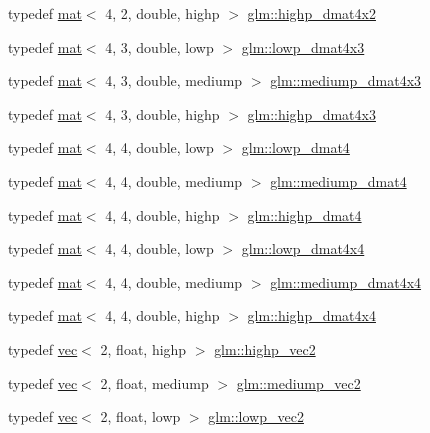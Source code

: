 \begin{DoxyCompactItemize}
\item 
typedef \hyperlink{structglm_1_1mat}{mat}$<$ 4, 2, double, highp $>$ \hyperlink{group__core__precision_ga22c6b4fe5bb2e33a3cfa1c026803dd68}{glm\+::highp\+\_\+dmat4x2}
\item 
typedef \hyperlink{structglm_1_1mat}{mat}$<$ 4, 3, double, lowp $>$ \hyperlink{group__core__precision_gaf829f4341a7592475df926eb9b416dd4}{glm\+::lowp\+\_\+dmat4x3}
\item 
typedef \hyperlink{structglm_1_1mat}{mat}$<$ 4, 3, double, mediump $>$ \hyperlink{group__core__precision_ga3c31b359e06498f36aae9bfde929a8ce}{glm\+::mediump\+\_\+dmat4x3}
\item 
typedef \hyperlink{structglm_1_1mat}{mat}$<$ 4, 3, double, highp $>$ \hyperlink{group__core__precision_ga9a5dab260df6e8c46c747bac0b8d2f38}{glm\+::highp\+\_\+dmat4x3}
\item 
typedef \hyperlink{structglm_1_1mat}{mat}$<$ 4, 4, double, lowp $>$ \hyperlink{group__core__precision_ga608895f4a515c7ac6cf3a1c2f11e13cc}{glm\+::lowp\+\_\+dmat4}
\item 
typedef \hyperlink{structglm_1_1mat}{mat}$<$ 4, 4, double, mediump $>$ \hyperlink{group__core__precision_ga4b027f0f888d5ec1e77a00cb5517f56a}{glm\+::mediump\+\_\+dmat4}
\item 
typedef \hyperlink{structglm_1_1mat}{mat}$<$ 4, 4, double, highp $>$ \hyperlink{group__core__precision_ga878bb8f4881dbf688ab9bbb5e2944a54}{glm\+::highp\+\_\+dmat4}
\item 
typedef \hyperlink{structglm_1_1mat}{mat}$<$ 4, 4, double, lowp $>$ \hyperlink{group__core__precision_ga336afc91799f59d9075eb94c3093612f}{glm\+::lowp\+\_\+dmat4x4}
\item 
typedef \hyperlink{structglm_1_1mat}{mat}$<$ 4, 4, double, mediump $>$ \hyperlink{group__core__precision_ga53d2b544e1cf6812ed3b2f152d16a770}{glm\+::mediump\+\_\+dmat4x4}
\item 
typedef \hyperlink{structglm_1_1mat}{mat}$<$ 4, 4, double, highp $>$ \hyperlink{group__core__precision_gad3df38df8c4f7ef9b38f03581ff60142}{glm\+::highp\+\_\+dmat4x4}
\item 
typedef \hyperlink{structglm_1_1vec}{vec}$<$ 2, float, highp $>$ \hyperlink{group__core__precision_gad588ab946806864499d6559c186ce3ba}{glm\+::highp\+\_\+vec2}
\item 
typedef \hyperlink{structglm_1_1vec}{vec}$<$ 2, float, mediump $>$ \hyperlink{group__core__precision_ga96e0011dd4d124d28fd52ef2f0c6f299}{glm\+::mediump\+\_\+vec2}
\item 
typedef \hyperlink{structglm_1_1vec}{vec}$<$ 2, float, lowp $>$ \hyperlink{group__core__precision_gaade87cebca8e38717e38c18df8fc9c8a}{glm\+::lowp\+\_\+vec2}

\end{DoxyCompactItemize}
